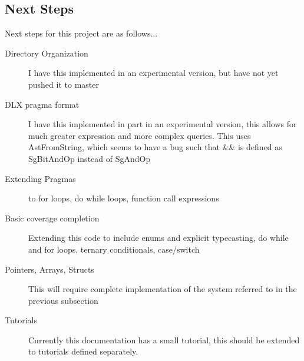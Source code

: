 \documentclass[11pt]{article}
\begin{document}
\subsection{Next Steps}
Next steps for this project are as follows...
\begin{description}
\item[Directory Organization] I have this implemented in an experimental version, but have not yet pushed it to master
\item[DLX pragma format] I have this implemented in part in an experimental version, this allows for much greater expression and more complex queries. This uses AstFromString, which seems to have a bug such that \&\& is defined as SgBitAndOp instead of SgAndOp
\item[Extending Pragmas] to for loops, do while loops, function call expressions
\item[Basic coverage completion] Extending this code to include enums and explicit typecasting, do while and for loops, ternary conditionals, case/switch
\item[Pointers, Arrays, Structs] This will require complete implementation of the system referred to in the previous subsection
\item[Tutorials] Currently this documentation has a small tutorial, this should be extended to tutorials defined separately.
\end{description}
\end{document}

